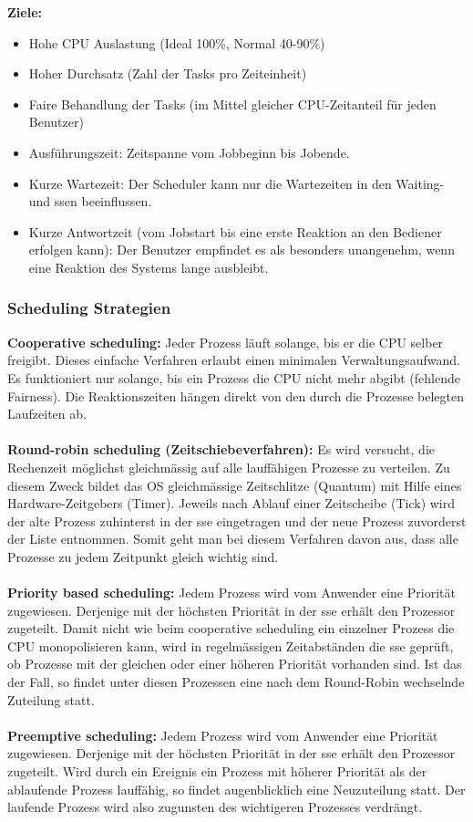 \textbf{Ziele:}
\begin{itemize}
    \item Hohe CPU Auslastung (Ideal 100\%, Normal 40-90\%)
    \item Hoher Durchsatz (Zahl der Tasks pro Zeiteinheit)
    \item Faire Behandlung der Tasks (im Mittel gleicher CPU-Zeitanteil für jeden Benutzer)
    \item Ausführungszeit: Zeitspanne vom Jobbeginn bis Jobende.
    \item Kurze Wartezeit: Der Scheduler kann nur die Wartezeiten in den Waiting- und ssen beeinflussen.
    \item Kurze Antwortzeit (vom Jobstart bis eine erste Reaktion an den Bediener erfolgen kann): Der Benutzer empfindet es als besonders unangenehm, wenn eine Reaktion des Systems lange ausbleibt.
\end{itemize}

\subsubsection{Scheduling Strategien}
\textbf{Cooperative scheduling:} Jeder Prozess läuft solange, bis er die CPU selber freigibt. Dieses einfache Verfahren erlaubt einen minimalen Verwaltungsaufwand. Es funktioniert
nur solange, bis ein Prozess die CPU nicht mehr abgibt (fehlende Fairness). Die Reaktionszeiten hängen direkt von den durch die Prozesse belegten Laufzeiten ab.\\ \\
\textbf{Round-robin scheduling (Zeitschiebeverfahren):} Es wird versucht, die Rechenzeit möglichst gleichmässig auf alle lauffähigen Prozesse zu verteilen. Zu diesem Zweck bildet das OS gleichmässige Zeitschlitze (Quantum) mit Hilfe eines Hardware-Zeitgebers (Timer). Jeweils nach Ablauf einer Zeitscheibe (Tick) wird der alte Prozess zuhinterst in der sse eingetragen und der neue Prozess zuvorderst der Liste entnommen. Somit geht man bei diesem Verfahren davon aus, dass alle Prozesse zu jedem Zeitpunkt gleich wichtig sind. \\ \\
\textbf{Priority based scheduling:}
Jedem Prozess wird vom Anwender eine Priorität zugewiesen. Derjenige mit der höchsten Priorität in der sse erhält den Prozessor zugeteilt. Damit nicht wie beim cooperative scheduling ein einzelner Prozess die CPU monopolisieren kann, wird in regelmässigen Zeitabständen die sse geprüft, ob Prozesse mit der gleichen oder einer höheren Priorität vorhanden sind. Ist das der Fall, so findet unter diesen Prozessen eine nach dem Round-Robin wechselnde Zuteilung statt. \\ \\
\textbf{Preemptive scheduling:}
Jedem Prozess wird vom Anwender eine Priorität zugewiesen. Derjenige mit der höchsten Priorität in der sse erhält den Prozessor zugeteilt. Wird durch ein Ereignis ein Prozess mit höherer Priorität als der ablaufende Prozess lauffähig, so findet augenblicklich eine Neuzuteilung statt. Der laufende Prozess wird also zugunsten des wichtigeren Prozesses verdrängt. 


